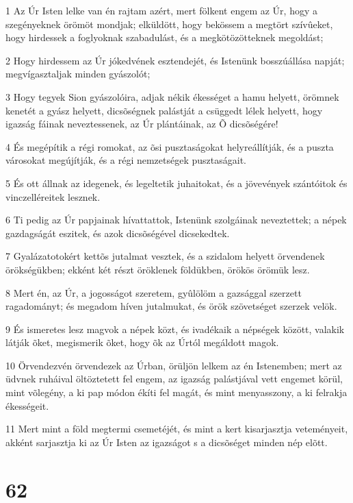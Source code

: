 \par 1 Az Úr Isten lelke van én rajtam azért, mert fölkent engem az Úr, hogy a szegényeknek örömöt mondjak; elküldött, hogy bekössem a megtört szívûeket, hogy hirdessek a foglyoknak szabadulást, és a megkötözötteknek  megoldást;
\par 2 Hogy hirdessem az Úr jókedvének esztendejét, és Istenünk bosszúállása napját; megvígasztaljak minden gyászolót;
\par 3 Hogy tegyek Sion gyászolóira, adjak nékik ékességet a hamu helyett, örömnek kenetét a gyász helyett, dicsõségnek palástját a csüggedt lélek helyett, hogy igazság fáinak neveztessenek, az Úr plántáinak, az Õ dicsõségére!
\par 4 És megépítik a régi romokat, az õsi pusztaságokat helyreállítják, és a puszta városokat megújítják, és a régi nemzetségek pusztaságait.
\par 5 És ott állnak az idegenek, és legeltetik juhaitokat, és a jövevények szántóitok és vinczelléreitek lesznek.
\par 6 Ti pedig az Úr papjainak hívattattok, Istenünk szolgáinak neveztettek; a népek gazdagságát eszitek, és azok dicsõségével dicsekedtek.
\par 7 Gyalázatotokért kettõs jutalmat vesztek, és a szidalom helyett örvendenek örökségükben; ekként két részt öröklenek földükben, örökös örömük lesz.
\par 8 Mert én, az Úr, a jogosságot szeretem, gyûlölöm a gazsággal szerzett ragadományt; és megadom híven jutalmukat, és örök szövetséget szerzek velök.
\par 9 És ismeretes lesz magvok a népek közt, és ivadékaik a népségek között, valakik látják õket, megismerik õket, hogy õk az Úrtól megáldott magok.
\par 10 Örvendezvén örvendezek az Úrban, örüljön lelkem az én Istenemben; mert az üdvnek ruháival öltöztetett fel engem, az igazság palástjával vett engemet körül, mint võlegény, a ki pap módon ékíti fel magát, és mint menyasszony, a ki felrakja ékességeit.
\par 11 Mert mint a föld megtermi csemetéjét, és mint a kert kisarjasztja veteményeit, akként sarjasztja ki az Úr Isten az igazságot s a dicsõséget minden nép elõtt.

\chapter{62}

